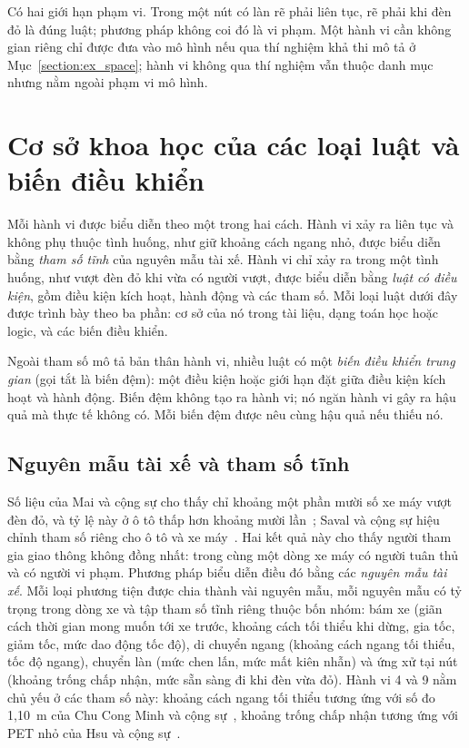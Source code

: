 \documentclass[../main.tex]{subfiles}
\begin{document}
Có hai giới hạn phạm vi. Trong một nút có làn rẽ phải liên tục, rẽ phải khi đèn đỏ là đúng luật; phương pháp không coi đó là vi phạm. Một hành vi cần không gian riêng chỉ được đưa vào mô hình nếu qua thí nghiệm khả thi mô tả ở Mục~\ref{section:ex_space}; hành vi không qua thí nghiệm vẫn thuộc danh mục nhưng nằm ngoài phạm vi mô hình.

\section{Cơ sở khoa học của các loại luật và biến điều khiển}
\label{section:rg_mechanisms}

Mỗi hành vi được biểu diễn theo một trong hai cách. Hành vi xảy ra liên tục và không phụ thuộc tình huống, như giữ khoảng cách ngang nhỏ, được biểu diễn bằng \emph{tham số tĩnh} của nguyên mẫu tài xế. Hành vi chỉ xảy ra trong một tình huống, như vượt đèn đỏ khi vừa có người vượt, được biểu diễn bằng \emph{luật có điều kiện}, gồm điều kiện kích hoạt, hành động và các tham số. Mỗi loại luật dưới đây được trình bày theo ba phần: cơ sở của nó trong tài liệu, dạng toán học hoặc logic, và các biến điều khiển.

Ngoài tham số mô tả bản thân hành vi, nhiều luật có một \emph{biến điều khiển trung gian} (gọi tắt là biến đệm): một điều kiện hoặc giới hạn đặt giữa điều kiện kích hoạt và hành động. Biến đệm không tạo ra hành vi; nó ngăn hành vi gây ra hậu quả mà thực tế không có. Mỗi biến đệm được nêu cùng hậu quả nếu thiếu nó.

\subsection{Nguyên mẫu tài xế và tham số tĩnh}

Số liệu của Mai và cộng sự cho thấy chỉ khoảng một phần mười số xe máy vượt đèn đỏ, và tỷ lệ này ở ô tô thấp hơn khoảng mười lần~\cite{mai2019signal}; Saval và cộng sự hiệu chỉnh tham số riêng cho ô tô và xe máy~\cite{saval2023mixed}. Hai kết quả này cho thấy người tham gia giao thông không đồng nhất: trong cùng một dòng xe máy có người tuân thủ và có người vi phạm. Phương pháp biểu diễn điều đó bằng các \emph{nguyên mẫu tài xế}. Mỗi loại phương tiện được chia thành vài nguyên mẫu, mỗi nguyên mẫu có tỷ trọng trong dòng xe và tập tham số tĩnh riêng thuộc bốn nhóm: bám xe (giãn cách thời gian mong muốn tới xe trước, khoảng cách tối thiểu khi dừng, gia tốc, giảm tốc, mức dao động tốc độ), di chuyển ngang (khoảng cách ngang tối thiểu, tốc độ ngang), chuyển làn (mức chen lấn, mức mất kiên nhẫn) và ứng xử tại nút (khoảng trống chấp nhận, mức sẵn sàng đi khi đèn vừa đỏ). Hành vi 4 và 9 nằm chủ yếu ở các tham số này: khoảng cách ngang tối thiểu tương ứng với số đo 1,10~m của Chu Cong Minh và cộng sự~\cite{chu2005speed}, khoảng trống chấp nhận tương ứng với PET nhỏ của Hsu và cộng sự~\cite{hsu2024v2x}.
\end{document}
